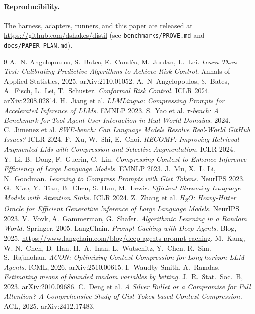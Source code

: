 \documentclass[11pt]{article}
\begin{document}
\paragraph{Reproducibility.} The harness, adapters, runners, and this paper are
released at \url{https://github.com/dshakes/distil} (see \texttt{benchmarks/PROVE.md}
and \texttt{docs/PAPER\_PLAN.md}).

\begin{thebibliography}{9}
 A.~N. Angelopoulos, S.~Bates, E.~Cand\`es, M.~Jordan, L.~Lei.
\emph{Learn Then Test: Calibrating Predictive Algorithms to Achieve Risk Control.}
Annals of Applied Statistics, 2025. arXiv:2110.01052.
 A.~N. Angelopoulos, S.~Bates, A.~Fisch, L.~Lei, T.~Schuster.
\emph{Conformal Risk Control.} ICLR 2024. arXiv:2208.02814.
 H.~Jiang et al. \emph{LLMLingua: Compressing Prompts for
Accelerated Inference of LLMs.} EMNLP 2023.
 S.~Yao et al. \emph{$\tau$-bench: A Benchmark for Tool-Agent-User
Interaction in Real-World Domains.} 2024.
 C.~Jimenez et al. \emph{SWE-bench: Can Language Models Resolve
Real-World GitHub Issues?} ICLR 2024.
 F.~Xu, W.~Shi, E.~Choi. \emph{RECOMP: Improving
Retrieval-Augmented LMs with Compression and Selective Augmentation.} ICLR 2024.
 Y.~Li, B.~Dong, F.~Guerin, C.~Lin. \emph{Compressing Context
to Enhance Inference Efficiency of Large Language Models.} EMNLP 2023.
 J.~Mu, X.~L. Li, N.~Goodman. \emph{Learning to Compress Prompts with
Gist Tokens.} NeurIPS 2023.
 G.~Xiao, Y.~Tian, B.~Chen, S.~Han, M.~Lewis. \emph{Efficient
Streaming Language Models with Attention Sinks.} ICLR 2024.
 Z.~Zhang et al. \emph{H\textsubscript{2}O: Heavy-Hitter Oracle for
Efficient Generative Inference of Large Language Models.} NeurIPS 2023.
 V.~Vovk, A.~Gammerman, G.~Shafer. \emph{Algorithmic Learning in a Random
World.} Springer, 2005.
 LangChain. \emph{Prompt Caching with Deep Agents.} Blog, 2025.
\url{https://www.langchain.com/blog/deep-agents-prompt-caching}.
 M.~Kang, W.-N.~Chen, D.~Han, H.~A.~Inan, L.~Wutschitz, Y.~Chen, R.~Sim,
S.~Rajmohan. \emph{ACON: Optimizing Context Compression for Long-horizon LLM Agents.}
ICML, 2026. arXiv:2510.00615.
 I.~Waudby-Smith, A.~Ramdas. \emph{Estimating means of bounded random variables
by betting.} J.~R.~Stat.~Soc.~B, 2023. arXiv:2010.09686.
 C.~Deng et al. \emph{A Silver Bullet or a Compromise for Full
Attention? A Comprehensive Study of Gist Token-based Context Compression.} ACL, 2025.
arXiv:2412.17483.
\end{thebibliography}
\end{document}
